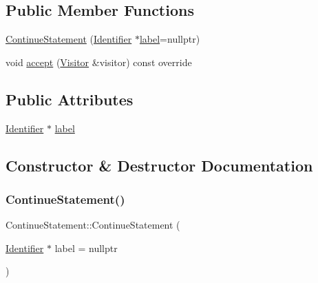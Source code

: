 \subsection*{Public Member Functions}
\begin{DoxyCompactItemize}
\item 
\hyperlink{struct_continue_statement_a45152addd01adf9e6d10c0af8505128c}{Continue\+Statement} (\hyperlink{struct_identifier}{Identifier} $\ast$\hyperlink{struct_continue_statement_a4bf8883a88736fa6ce4341e9029db194}{label}=nullptr)
\item 
void \hyperlink{struct_continue_statement_a9288fc77078160a2709a6329f1fe4838}{accept} (\hyperlink{struct_visitor}{Visitor} \&visitor) const override
\end{DoxyCompactItemize}
\subsection*{Public Attributes}
\begin{DoxyCompactItemize}
\item 
\hyperlink{struct_identifier}{Identifier} $\ast$ \hyperlink{struct_continue_statement_a4bf8883a88736fa6ce4341e9029db194}{label}
\end{DoxyCompactItemize}


\subsection{Constructor \& Destructor Documentation}
\mbox{\label{struct_continue_statement_a45152addd01adf9e6d10c0af8505128c}} 
\subsubsection{\texorpdfstring{Continue\+Statement()}{ContinueStatement()}}
{\footnotesize\ttfamily Continue\+Statement\+::\+Continue\+Statement (\begin{DoxyParamCaption}\item[{\hyperlink{struct_identifier}{Identifier} $\ast$}]{label = {\ttfamily nullptr} }\end{DoxyParamCaption})\hspace{0.3cm}{\ttfamily [inline]}}



